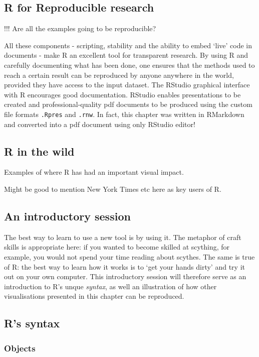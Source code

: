 \documentclass[]{article}
\begin{document}
\subsection{R for Reproducible research}

!!! Are all the examples going to be reproducible?

All these components - scripting, stability and the ability to embed
`live' code in documents - make R an excellent tool for transparent
research. By using R and carefully documenting what has been done, one
ensures that the methods used to reach a certain result can be
reproduced by anyone anywhere in the world, provided they have access to
the input dataset. The RStudio graphical interface with R encourages
good documentation. RStudio enables presentations to be created and
professional-quality pdf documents to be produced using the custom file
formats \texttt{.Rpres} and \texttt{.rnw}. In fact, this chapter was
written in RMarkdown and converted into a pdf document using only
RStudio editor!

\subsection{R in the wild}

Examples of where R has had an important visual impact.

Might be good to mention New York Times etc here as key users of R.

\subsection{An introductory session}

The best way to learn to use a new tool is by using it. The metaphor of
craft skills is appropriate here: if you wanted to become skilled at
scything, for example, you would not spend your time reading about
scythes. The same is true of R: the best way to learn how it works is to
`get your hands dirty' and try it out on your own computer. This
introductory session will therefore serve as an introduction to R's
unque \emph{syntax}, as well an illustration of how other visualisations
presented in this chapter can be reproduced.

\subsection{R's syntax}

\subsubsection{Objects}
\end{document}
